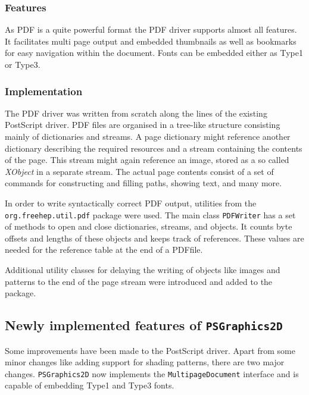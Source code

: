\documentclass[a4paper]{article}
\newcommand{\class}[1]{\texttt{#1}}
\newcommand{\fhclass}[1]{\class{#1}}
\newcommand{\techterm}[1]{\textit{#1}}
\newcommand{\ps}{PostScript}
\newcommand{\pdf}{PDF}
\begin{document}
\subsubsection{Features}
As \pdf{} is a quite powerful format the \pdf{} driver supports almost all
features. It facilitates multi page output and embedded
thumbnails as well as bookmarks for easy navigation within the
document. Fonts can be embedded either as Type1 or Type3.


\subsubsection{Implementation}
The \pdf{} driver was written from scratch along the lines of the
existing \ps{} driver. \pdf{} files \cite{pdfref} are
organised in a tree-like structure consisting mainly of dictionaries
and streams. A page dictionary might reference another dictionary
describing the required resources and  a stream containing the
contents of the page. This stream might again reference an image, stored as a so
called \techterm{XObject} in a separate stream. The actual page
contents consist of a set of commands for constructing and filling
paths, showing text, and many more.

In order to write syntactically correct \pdf{} output, utilities from
the \fhclass{org.freehep.util.pdf} package were used. The main class
\fhclass{PDFWriter} has a set of methods to open and close
dictionaries, streams, and objects. It counts byte offsets and
lengths of these objects and keeps track of references. These values
are needed for the reference table at the end of a \pdf file.

Additional utility classes for delaying the writing of objects like
images and patterns to the end of the page stream were introduced and
added to the package.


\subsection{Newly implemented features of \fhclass{PSGraphics2D}}
\label{psg2d}
Some improvements have been made to the \ps{} \cite{psref}
driver. Apart from some minor changes like adding support for shading
patterns, there are two major changes. \fhclass{PSGraphics2D} now
implements the \fhclass{Multi\-page\-Docu\-ment} interface and is capable of
embedding Type1 and Type3 fonts.
\end{document}
